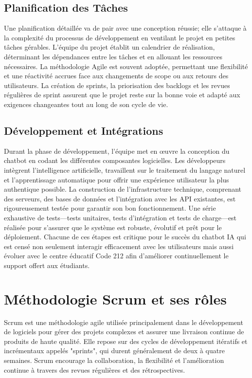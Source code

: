 \documentclass[a4paper, 11pt, openany]{report}
\begin{document}
\subsection{Planification des Tâches}
Une planification détaillée va de pair avec une conception réussie; elle s'attaque à la complexité du processus de développement en ventilant le projet en petites tâches gérables. L'équipe du projet établit un calendrier de réalisation, déterminant les dépendances entre les tâches et en allouant les ressources nécessaires. La méthodologie Agile est souvent adoptée, permettant une flexibilité et une réactivité accrues face aux changements de scope ou aux retours des utilisateurs. La création de sprints, la priorisation des backlogs et les revues régulières de sprint assurent que le projet reste sur la bonne voie et adapté aux exigences changeantes tout au long de son cycle de vie.

\subsection{Développement et Intégrations}
Durant la phase de développement, l'équipe met en œuvre la conception du chatbot en codant les différentes composantes logicielles. Les développeurs intègrent l'intelligence artificielle, travaillent sur le traitement du langage naturel et l'apprentissage automatique pour offrir une expérience utilisateur la plus authentique possible. La construction de l'infrastructure technique, comprenant des serveurs, des bases de données et l'intégration avec les API existantes, est rigoureusement testée pour garantir son bon fonctionnement. Une série exhaustive de tests—tests unitaires, tests d'intégration et tests de charge—est réalisée pour s'assurer que le système est robuste, évolutif et prêt pour le déploiement.
Chacune de ces étapes est critique pour le succès du chatbot IA qui est censé non seulement interagir efficacement avec les utilisateurs mais aussi évoluer avec le centre éducatif Code 212 afin d'améliorer continuellement le support offert aux étudiants.


\section{Méthodologie Scrum et ses rôles}

Scrum est une méthodologie agile utilisée principalement dans le développement de logiciels pour gérer des projets complexes et assurer une livraison continue de produits de haute qualité. Elle repose sur des cycles de développement itératifs et incrémentaux appelés "sprints", qui durent généralement de deux à quatre semaines. Scrum encourage la collaboration, la flexibilité et l'amélioration continue à travers des revues régulières et des rétrospectives.
\end{document}
